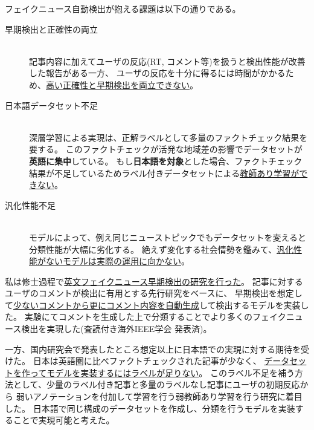 フェイクニュース自動検出が抱える課題は以下の通りである。
\begin{description}
    \item[早期検出と正確性の両立] \mbox{}\\
        記事内容に加えてユーザの反応(RT, コメント等)を扱うと検出性能が改善した報告がある\cite{Wu:2018:TFF:3159652.3159677}一方、
        ユーザの反応を十分に得るには時間がかかるため、\underline{高い正確性と早期検出を両立できない}。
    \item[日本語データセット不足] \mbox{}\\
        深層学習による実現は、正解ラベルとして多量のファクトチェック結果を要する。
        このファクトチェックが活発な地域差の影響でデータセットが\textbf{英語に集中}\cite{fakenewsnet}している。
        もし\textbf{日本語を対象}とした場合、ファクトチェック結果が不足しているためラベル付きデータセットによる\underline{教師あり学習ができない}。
    \item[汎化性能不足] \mbox{}\\
        モデルによって、例え同じニューストピックでもデータセットを変えると分類性能が大幅に劣化する\cite{coviddiff}。
        絶えず変化する社会情勢を鑑みて、\underline{汎化性能がないモデルは実際の運用に向かない}。
\end{description}

私は修士過程で\underline{英文フェイクニュース早期検出の研究を行った}。
記事に対するユーザのコメントが検出に有用とする先行研究をベースに、
早期検出を想定して\underline{少ないコメントから更にコメント内容を自動生成}して検出するモデルを実装した。
実験にてコメントを生成した上で分類することでより多くのフェイクニュース検出を実現した(査読付き海外IEEE学会 発表済\cite{ines})。

一方、国内研究会で発表したところ想定以上に日本語での実現に対する期待を受けた。
日本は英語圏に比べファクトチェックされた記事が少なく、
\underline{データセットを作ってモデルを実装するにはラベルが足りない}。
このラベル不足を補う方法として、少量のラベル付き記事と多量のラベルなし記事にユーザの初期反応から
弱いアノテーションを付加して学習を行う弱教師あり学習を行う研究\cite{mwss}に着目した。
日本語で同じ構成のデータセットを作成し、分類を行うモデルを実装することで実現可能と考えた。


